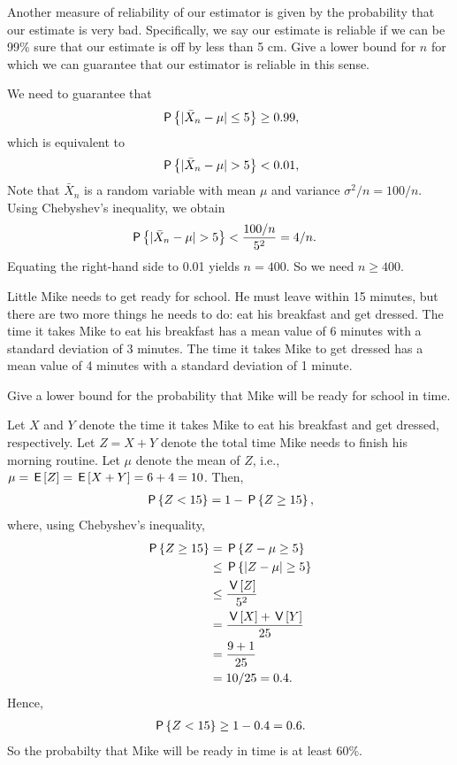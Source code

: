 \documentclass[lectures]{subfiles}
\begin{document}
\begin{exercise}
Another measure of reliability of our estimator is given by the probability that our estimate is very bad. Specifically, we say our estimate is reliable if we can be 99\% sure that our estimate is off by less than 5 cm. Give a lower bound for $n$ for which we can guarantee that our estimator is reliable in this sense.
\begin{solution}
We need to guarantee that
\begin{align}
    \P{| \bar{X}_n - \mu | \leq 5} \geq 0.99,
\end{align}
which is equivalent to
\begin{align}
    \P{| \bar{X}_n - \mu | > 5} < 0.01,
\end{align}
Note that $\bar{X}_n$ is a random variable with mean $\mu$ and variance $\sigma^2/n = 100/n$. Using Chebyshev's inequality, we obtain
\begin{align}
    \P{| \bar{X}_n - \mu | > 5} &< \frac{100/n}{5^2} = 4/n.
\end{align}
Equating the right-hand side to 0.01 yields $n=400$. So we need $n \geq 400$.
\end{solution}
\end{exercise}


Little Mike needs to get ready for school. He must leave within 15 minutes, but there are two more things he needs to do: eat his breakfast and get dressed. The time it takes Mike to eat his breakfast has a mean value of 6 minutes with a standard deviation of 3 minutes. The time it takes Mike to get dressed has a mean value of 4 minutes with a standard deviation of 1 minute.
\begin{exercise}
Give a lower bound for the probability that Mike will be ready for school in time.
\begin{solution}
Let $X$ and $Y$ denote the time it takes Mike to eat his breakfast and get dressed, respectively. Let $Z = X + Y$ denote the total time Mike needs to finish his morning routine. Let $\mu$ denote the mean of $Z$, i.e., $\mu = \E{Z} = \E{X+Y} = 6+4 = 10$. Then,
\begin{align}
    \P{Z < 15} = 1 - \P{Z \geq 15},
\end{align}
where, using Chebyshev's inequality,
\begin{align}
  \P{Z \geq 15} &= \P{Z - \mu \geq 5} \\
  &\leq \P{|Z - \mu| \geq 5} \\
  &\leq \frac{\V{Z}}{5^2} \\
  &= \frac{\V{X} + \V{Y}}{25} \\
  &= \frac{9 + 1}{25} \\
  &= 10/25 = 0.4.
\end{align}
Hence,
\begin{align}
    \P{Z < 15} \geq 1 - 0.4 = 0.6.
\end{align}
So the probabilty that Mike will be ready in time is at least 60\%.
\end{solution}
\end{exercise}
\end{document}
